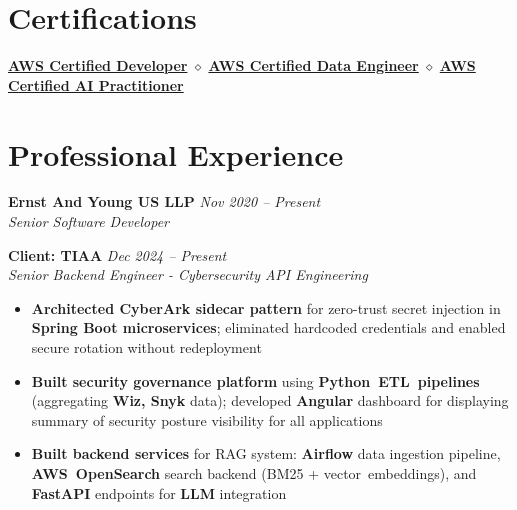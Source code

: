 \documentclass[11pt,a4paper]{article}
\newcommand{\resumeItem}[1]{\item\small{#1}}
\newcommand{\resumeItemList}[1]{\begin{itemize}[leftmargin=0.5in, itemsep=0.25em, parsep=0pt, partopsep=0pt, topsep=0.25em]
    \small
    #1
\end{itemize}}
\begin{document}
\section{Certifications}
\begin{center}
    \small\href{https://www.credly.com/badges/aa170f9b-6c94-465f-b497-0b8e4cf93297/public_url}{\textbf{AWS Certified Developer}} \hspace{0.3em} $\diamond$ \hspace{0.3em} \href{https://www.credly.com/badges/6ec4ce21-91d8-4bb5-9867-b936f250ded0/public_url}{\textbf{AWS Certified Data Engineer}} \hspace{0.3em} $\diamond$ \hspace{0.3em} \href{https://www.credly.com/badges/09a07b44-fd10-48ff-a694-604c6f9628a7/public_url}{\textbf{AWS Certified AI Practitioner}}
\end{center}

\section{Professional Experience}

\textbf{Ernst And Young US LLP} \hfill \textit{Nov 2020 -- Present}\\
\textit{Senior Software Developer}

\textbf{Client: TIAA} \hfill \textit{Dec 2024 -- Present}\\
\textit{Senior Backend Engineer - Cybersecurity API Engineering}
\resumeItemList{
    \resumeItem{\textbf{Architected CyberArk sidecar pattern} for zero-trust secret injection in \textbf{Spring Boot microservices}; eliminated hardcoded credentials and enabled secure rotation without redeployment}
    \resumeItem{\textbf{Built security governance platform} using \textbf{Python~ETL~pipelines} (aggregating \textbf{Wiz, Snyk} data); developed \textbf{Angular} dashboard for displaying summary of security posture visibility for all applications}
    \resumeItem{\textbf{Built backend services} for RAG system: \textbf{Airflow} data ingestion pipeline, \textbf{AWS~OpenSearch} search backend (BM25 + vector~embeddings), and \textbf{FastAPI} endpoints for \textbf{LLM} integration}
}
\vspace{0.4em}
\end{document}
